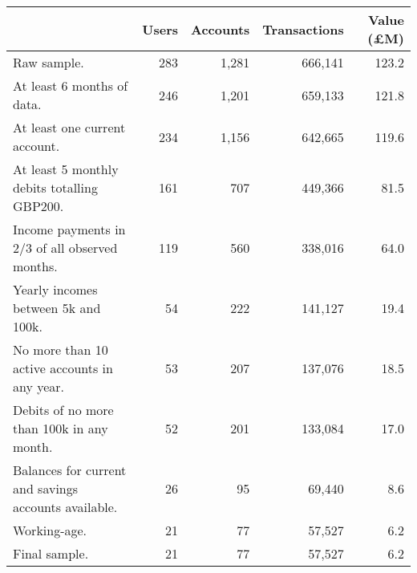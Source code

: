 \begin{tabular}{lrrrr}
\toprule
                                                     & Users & Accounts & Transactions & Value (\pounds M) \\
\midrule
                                         Raw sample. &   283 &    1,281 &      666,141 &             123.2 \\
                          At least 6 months of data. &   246 &    1,201 &      659,133 &             121.8 \\
                       At least one current account. &   234 &    1,156 &      642,665 &             119.6 \\
         At least 5 monthly debits totalling GBP200. &   161 &      707 &      449,366 &              81.5 \\
      Income payments in 2/3 of all observed months. &   119 &      560 &      338,016 &              64.0 \\
                 Yearly incomes between 5k and 100k. &    54 &      222 &      141,127 &              19.4 \\
        No more than 10 active accounts in any year. &    53 &      207 &      137,076 &              18.5 \\
           Debits of no more than 100k in any month. &    52 &      201 &      133,084 &              17.0 \\
Balances for current and savings accounts available. &    26 &       95 &       69,440 &               8.6 \\
                                        Working-age. &    21 &       77 &       57,527 &               6.2 \\
                                       Final sample. &    21 &       77 &       57,527 &               6.2 \\
\bottomrule
\end{tabular}
